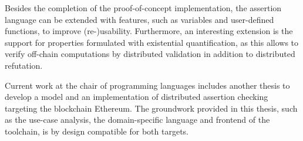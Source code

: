 Besides the completion of the proof-of-concept implementation, the assertion language can be extended with features, such as variables and user-defined functions, to improve (re-)usability. Furthermore, an interesting extension is the support for properties formulated with existential quantification, as this allows to verify off-chain computations by distributed validation in addition to distributed refutation. 

Current work at the chair of programming languages includes another thesis to develop a model and an implementation of distributed assertion checking targeting the blockchain Ethereum. The groundwork provided in this thesis, such as the use-case analysis, the domain-specific language and frontend of the toolchain, is by design compatible for both targets.